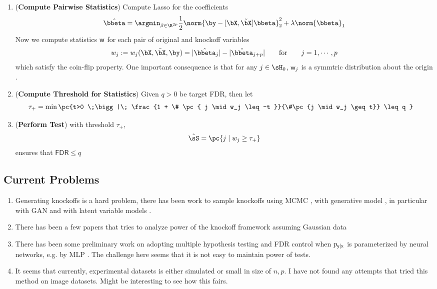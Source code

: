 \documentclass[11pt]{article}
\begin{document}
\begin{enumerate}
    \item (\textbf{Compute Pairwise Statistics}) Compute Lasso for the coefficients
    \begin{align*}
        \hat{\bbeta}
            = \argmin_{\beta\in\R^{2p}}
                \frac{1}{2} \norm{\by - [\bX,\tilde{\bX}]\bbeta}_2^2 + \lambda \norm{\bbeta}_1
    \end{align*}
    Now we compute statistics $\mathsf{w}$ for each pair of original and knockoff variables
    \begin{align*}
        w_j
            := w_j(\bX,\tilde{\bX},\by)
            = |\hat{\bbeta}_j| - |\hat{\bbeta}_{j+p}|
        \quad\quad\text{for}\quad\quad
            j = 1,\cdots,p
    \end{align*}
    which satisfy the coin-flip property. One important consequence is that for any $j\in\sH_0$, $\mathsf{w}_j$ is a symmtric distribution about the origin \cite{barberControllingFalseDiscovery2015,candesPanningGoldModelX2017}.
    \item (\textbf{Compute Threshold for Statistics}) Given $q>0$ be target FDR, then let 
    \begin{align*}
        \tau_+
            &= \min\pc{t>0 \;\bigg|\; \frac{1 + \# \pc{ j \mid w_j \leq -t }}{\#\pc{j \mid w_j \geq t}} \leq q }
    \end{align*}
    \item (\textbf{Perform Test}) with threshold $\tau_+$,
    \begin{align*}
        \hat{\sS} = 
            \pc{j \mid w_j \geq \tau_+}
    \end{align*}
    ensures that $\textsf{FDR}\leq q$
\end{enumerate} 

\subsection{Current Problems}

\begin{enumerate}
    \item Generating knockoffs is a hard problem, there has been work to sample knockoffs using MCMC \cite{batesMetropolizedKnockoffSampling2019}, with generative model \cite{romanoDeepKnockoffs2018}, in particular with GAN \cite{jordonKnockoffGANGeneratingKnockoffs2018} and with latent variable models \cite{gimenezKnockoffsMassNew2019}.
    \item There has been a few papers that tries to analyze power of the knockoff framework assuming Gaussian data \cite{liuPowerAnalysisKnockoff2020}
    \item There has been some preliminary work on adopting multiple hypothesis testing and FDR control when $p_{\mathsf{y}|\mathsf{x}}$ is parameterized by neural networks, e.g. by MLP \cite{luDeepPINKReproducibleFeature2018}. The challenge here seems that it is not easy to maintain power of tests.
    \item It seems that currently, experimental datasets is either simulated or small in size of $n,p$. I have not found any attempts that tried this method on image datasets. Might be interesting to see how this fairs.
\end{enumerate}



 
\newpage
\printbibliography 
\end{document}
